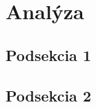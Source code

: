 \chapter{Analýza}
\par \lipsum[3]
\cite{coplienAOSDObjects}

\section{Podsekcia 1}
\par \lipsum[8]
\cite{opensourceArch}

\section{Podsekcia 2}
\par \lipsum[6]
\cite{coplienGOTODCI, coplienOredevDCI}
\par \lipsum[5]
\cite{generativeProg}